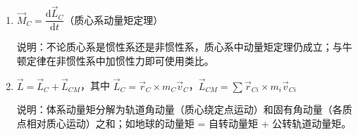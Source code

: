 \documentclass[12pt,a4paper]{ctexart}
\begin{document}
\begin{enumerate}[leftmargin=3em,label=\textbf{公式\arabic*}：,ref=公式\arabic*]
    \item $\vec{M}_C = \dfrac{\mathrm{d}\vec{L}_C}{\mathrm{d}t}$（质心系动量矩定理）

    说明：不论质心系是惯性系还是非惯性系，质心系中动量矩定理仍成立；与牛顿定律在非惯性系中加惯性力即可使用类比。

    \item $\vec{L} = \vec{L}_C + \vec{L}_{CM}$，其中 $\vec{L}_C = \vec{r}_C\times m_C\vec{v}_C$，$\vec{L}_{CM} = \sum \vec{r}_{Ci}\times m_i\vec{v}_{Ci}$

    说明：体系动量矩分解为轨道角动量（质心绕定点运动）和固有角动量（各质点相对质心运动）之和；如地球的动量矩 = 自转动量矩 + 公转轨道动量矩。

\end{enumerate}
\end{document}
